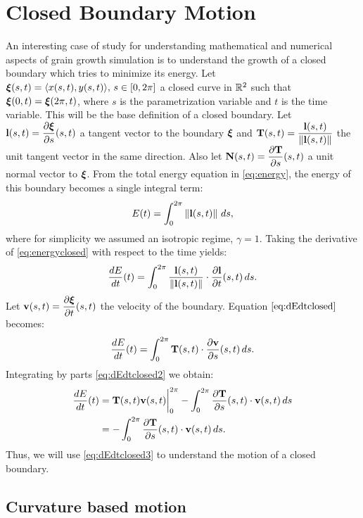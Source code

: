 \chapter{Closed Boundary Motion}
\label{chap:chap2}

An interesting case of study for understanding mathematical and numerical aspects of grain growth simulation is to understand the growth of a closed boundary which tries to minimize its energy. Let $\bm{\xi}(s,t) = \langle x(s,t), y(s,t)\rangle,\, s \in [0, 2\pi]$ a closed curve in $\mathbb{R}^2$ such that $\bm{\xi}(0,t) = \bm{\xi}(2\pi,t)$, where $s$ is the parametrization variable and $t$ is the time variable. This will be the base definition of a closed boundary. Let $\mathbf{l}(s,t) = \dfrac{\partial \bm{\xi}}{\partial s}(s,t)$ a tangent vector to the boundary $\bm{\xi}$ and $\mathbf{T}(s,t) = \dfrac{\mathbf{l}(s,t)}{\left\lVert\mathbf{l}(s,t)\right\rVert}$ the unit tangent vector in the same direction. Also let $\mathbf{N}(s,t) = \dfrac{\partial \mathbf{T}}{\partial s}(s,t)$ a unit normal vector to $\bm{\xi}$. From the total energy equation in \eqref{eq:energy}, the energy of this boundary becomes a single integral term:
\begin{equation}
    E(t) = \int_0^{2\pi} \left\lVert\mathbf{l}(s,t)\right\rVert\, ds,
    \label{eq:energyclosed}
\end{equation}
where for simplicity we assumed an isotropic regime, \ie $\gamma = 1$. Taking the derivative of \eqref{eq:energyclosed} with respect to the time yields:
\begin{equation}
    \dfrac{dE}{dt}(t) = \int_0^{2\pi} \dfrac{\mathbf{l}(s,t)}{\left\lVert\mathbf{l}(s,t)\right\rVert} \cdot \dfrac{\partial \mathbf{l}}{\partial t}(s,t) \, ds.
    \label{eq:dEdtclosed}
\end{equation}
Let $\mathbf{v}(s,t) = \dfrac{\partial \bm{\xi}}{\partial t}(s,t)$ the velocity of the boundary. Equation $\eqref{eq:dEdtclosed}$ becomes:
\begin{equation}
    \dfrac{dE}{dt}(t) = \int_0^{2\pi} \mathbf{T}(s,t) \cdot \dfrac{\partial \mathbf{v}}{\partial s}(s,t) \, ds.
    \label{eq:dEdtclosed2}
\end{equation}
Integrating by parts \eqref{eq:dEdtclosed2} we obtain:
\begin{align}
    \dfrac{dE}{dt}(t) &= \mathbf{T}(s,t)\mathbf{v}(s,t)\bigg\rvert_{0}^{2\pi} - \int_0^{2\pi}  \dfrac{\partial \mathbf{T}}{\partial s}(s,t) \cdot \mathbf{v}(s,t) \, ds \nonumber\\
    &= -\int_0^{2\pi} \dfrac{\partial \mathbf{T}}{\partial s}(s,t) \cdot \mathbf{v}(s,t)\, ds. \label{eq:dEdtclosed3}
\end{align}
Thus, we will use \eqref{eq:dEdtclosed3} to understand the motion of a closed boundary.

\section{Curvature based motion}

